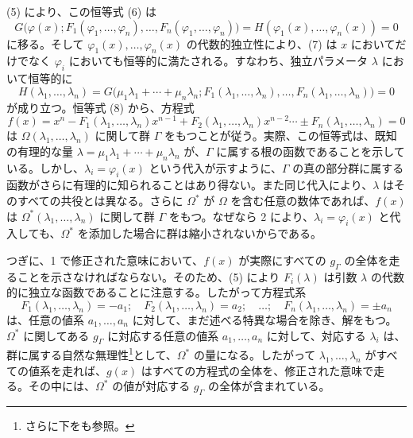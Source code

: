\documentclass[11pt]{article}
\begin{document}
(5) により、この恒等式 (6) は
\begin{equation}\tag{7}
G\bigl(\varphi(x);F_1(\varphi_1,
\ldots,\varphi_n),\ldots,F_n(\varphi_1,
\ldots,\varphi_n)\bigr)
=H(\varphi_1(x),\ldots,\varphi_n(x))=0
\end{equation}
に移る。そして $\varphi_1(x),\ldots,\varphi_n(x)$ の代数的独立性により、(7) は $x$ においてだけでなく $\varphi_i$ においても恒等的に満たされる。すなわち、独立パラメータ $\lambda$ において恒等的に
\begin{equation}\tag{8}
H(\lambda_1,
\ldots,\lambda_n)=G\bigl(\mu_1\lambda_1+\cdots+\mu_n\lambda_n;
F_1(\lambda_1,
\ldots,\lambda_n),\ldots,F_n(\lambda_1,
\ldots,\lambda_n)\bigr)=0
\end{equation}
が成り立つ。恒等式 (8) から、方程式
\begin{equation}\tag{9}
f(x)=x^n-F_1(\lambda_1,
\ldots,\lambda_n)x^{n-1}+F_2(\lambda_1,
\ldots,\lambda_n)x^{n-2}\cdots \pm F_n(\lambda_1,
\ldots,\lambda_n)=0
\end{equation}
は $\Omega(\lambda_1,
\ldots,\lambda_n)$ に関して群 $\Gamma$ をもつことが従う。実際、この恒等式は、既知の有理的な量 $\lambda=\mu_1\lambda_1+
\cdots+
\mu_n\lambda_n$ が、$\Gamma$ に属する根の函数であることを示している。しかし、$\lambda_i=\varphi_i(x)$ という代入が示すように、$\Gamma$ の真の部分群に属する函数がさらに有理的に知られることはあり得ない。また同じ代入により、$\lambda$ はそのすべての共役とは異なる。さらに $\Omega^*$ が $\Omega$ を含む任意の数体であれば、$f(x)$ は $\Omega^*(\lambda_1,
\ldots,\lambda_n)$ に関して群 $\Gamma$ をもつ。なぜなら 2 により、$\lambda_i=\varphi_i(x)$ と代入しても、$\Omega^*$ を添加した場合に群は縮小されないからである。

つぎに、1 で修正された意味において、$f(x)$ が実際にすべての $g_\Gamma$ の全体を走ることを示さなければならない。そのため、(5) により $F_i(\lambda)$ は引数 $\lambda$ の代数的に独立な函数であることに注意する。したがって方程式系
\begin{equation}\tag{10}
F_1(\lambda_1,
\ldots,\lambda_n)=-a_1;\quad F_2(\lambda_1,
\ldots,\lambda_n)=a_2;\quad\ldots;\quad F_n(\lambda_1,
\ldots,\lambda_n)=\pm a_n
\end{equation}
は、任意の値系 $a_1,
\ldots,a_n$ に対して、まだ述べる特異な場合を除き、解をもつ。$\Omega^*$ に関してある $g_\Gamma$ に対応する任意の値系 $a_1,
\ldots,a_n$ に対して、対応する $\lambda_i$ は、群に属する自然な無理性\footnote{さらに下をも参照。}として、$\Omega^*$ の量になる。したがって $\lambda_1,
\ldots,\lambda_n$ がすべての値系を走れば、$g(x)$ はすべての方程式の全体を、修正された意味で走る。その中には、$\Omega^*$ の値が対応する $g_\Gamma$ の全体が含まれている。
\end{document}
